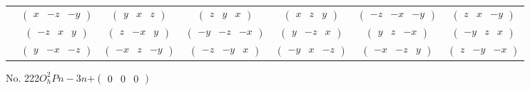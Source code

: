 \documentclass[fleqn,9pt,landscape]{jsarticle}
\begin{document}
\begin{center}
\begin{longtable}{ccccccc}
& $ \begin{pmatrix} x & - z & - y \end{pmatrix} $ & $ \begin{pmatrix} y & x & z \end{pmatrix} $ & $ \begin{pmatrix} z & y & x \end{pmatrix} $ & $ \begin{pmatrix} x & z & y \end{pmatrix} $ & $ \begin{pmatrix} - z & - x & - y \end{pmatrix} $ & $ \begin{pmatrix} z & x & - y \end{pmatrix} $ \\
& $ \begin{pmatrix} - z & x & y \end{pmatrix} $ & $ \begin{pmatrix} z & - x & y \end{pmatrix} $ & $ \begin{pmatrix} - y & - z & - x \end{pmatrix} $ & $ \begin{pmatrix} y & - z & x \end{pmatrix} $ & $ \begin{pmatrix} y & z & - x \end{pmatrix} $ & $ \begin{pmatrix} - y & z & x \end{pmatrix} $ \\
& $ \begin{pmatrix} y & - x & - z \end{pmatrix} $ & $ \begin{pmatrix} - x & z & - y \end{pmatrix} $ & $ \begin{pmatrix} - z & - y & x \end{pmatrix} $ & $ \begin{pmatrix} - y & x & - z \end{pmatrix} $ & $ \begin{pmatrix} - x & - z & y \end{pmatrix} $ & $ \begin{pmatrix} z & - y & - x \end{pmatrix} $ \\
\end{longtable}
\end{center}
\newpage
No. 222\quad$O_{h}^{2}$\quad$Pn-3n$\quad[ cubic ]\quad$+\begin{pmatrix} 0 & 0 & 0 \end{pmatrix}$
\end{document}
